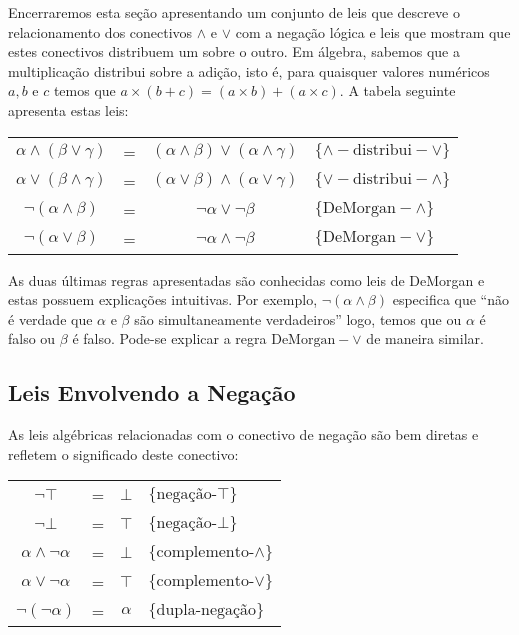 Encerraremos esta seção apresentando um conjunto de leis que descreve
o relacionamento dos conectivos $\land$ e $\lor$ com a negação lógica
e leis que mostram que estes conectivos distribuem um sobre o outro.
Em álgebra, sabemos que a multiplicação distribui sobre a adição, isto
é, para quaisquer valores numéricos $a,b$ e $c$ temos que $a \times (b
+ c) = (a\times b) + (a\times c)$. A tabela seguinte apresenta estas
leis:

\begin{table}[h]
  \begin{tabular}{|cccl|}
    \hline
      $\alpha\land (\beta \lor \gamma)$ & = & $(\alpha \land
      \beta)\lor(\alpha \land \gamma)$ &
      $\{\land-\text{distribui}-\lor\}$\\
        $\alpha\lor (\beta \land \gamma)$ & = & $(\alpha \lor
      \beta)\land(\alpha \lor \gamma)$ & $\{\lor-\text{distribui}-\land\}$\\
      $\neg (\alpha\land \beta)$ & = & $\neg \alpha \lor \neg \beta$ &
      $\{\text{DeMorgan}-\land\}$\\
      $\neg (\alpha\lor \beta)$ & = & $\neg \alpha \land \neg \beta$ &
      $\{\text{DeMorgan}-\lor\}$\\
      \hline
  \end{tabular}
  \centering
\end{table}

As duas últimas regras apresentadas são conhecidas como leis de
DeMorgan e estas possuem explicações intuitivas. Por exemplo,
$\neg (\alpha \land \beta)$ especifica que ``não é verdade que
$\alpha$ e $\beta$ são simultaneamente verdadeiros'' logo, temos que
ou $\alpha$ é falso ou $\beta$ é falso. Pode-se explicar a regra
$\text{DeMorgan}-\lor$ de maneira similar.

\subsection{Leis Envolvendo a Negação}

As leis algébricas relacionadas com o conectivo de negação são bem
diretas e refletem o significado deste conectivo:

\begin{table}[h]
  \begin{tabular}{|cccl|}
    \hline
    $\neg \top$ & = & $\bot$ & $\{\text{negação-}\top\}$\\
    $\neg \bot$ & = & $\top$ & $\{\text{negação-}\bot\}$\\
    $\alpha\land\neg\alpha$ & = & $\bot$ &
    $\{\text{complemento-}\land\}$\\
    $\alpha\lor\neg\alpha$ & = & $\top$ &
    $\{\text{complemento-}\lor\}$\\
    $\neg(\neg\alpha)$ & = & $\alpha$ & $\{\text{dupla-negação}\}$\\
    \hline
  \end{tabular}
  \centering
\end{table}

